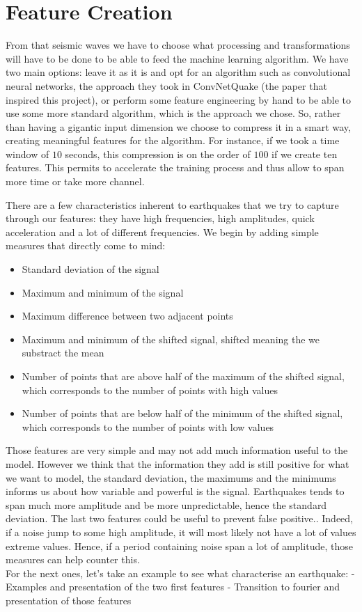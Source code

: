 \documentclass[10pt,conference,compsocconf]{IEEEtran}
\begin{document}
\section{Feature Creation}
From that seismic waves we have to choose what processing and transformations will have to be done to be able to feed the machine learning algorithm. We have two main options: leave it as it is and opt for an algorithm such as convolutional neural networks, the approach they took in ConvNetQuake (the paper \cite{ConvNetPaper} that inspired this project), or perform some feature engineering by hand to be able to use some more standard algorithm, which is the approach we chose. So, rather than having a gigantic input dimension we choose to compress it in a smart way, creating meaningful features for the algorithm. For instance, if we took a time window of $10$ seconds, this compression is on the order of $100$ if we create ten features. This permits to accelerate the training process and thus allow to span more time or take more channel.\newline

There are a few characteristics inherent to earthquakes that we try to capture through our features: they have high frequencies, high amplitudes, quick acceleration and a lot of different frequencies. We begin by adding simple measures that directly come to mind:\newline
\begin{itemize}
	\item{Standard deviation of the signal}
	\item{Maximum and minimum of the signal}
	\item{Maximum difference between two adjacent points}
	\item{Maximum and minimum of the shifted signal, shifted meaning the we substract the mean}
	\item{Number of points that are above half of the maximum of the shifted signal, which corresponds to the number of points with high values}
	\item{Number of points that are below half of the minimum of the shifted signal, which corresponds to the number of points with low values}
\end{itemize}

Those features are very simple and may not add much information useful to the model. However we think that the information they add is still positive for what we want to model, the standard deviation, the maximums and the minimums informs us about how variable and powerful is the signal. Earthquakes tends to span much more amplitude and be more unpredictable, hence the standard deviation. The last two features could be useful to prevent false positive.. Indeed, if a noise jump to some high amplitude, it will most likely not have a lot of values extreme values. Hence, if a period containing noise span a lot of amplitude, those measures can help counter this.\\
For the next ones, let's take an example to see what characterise an earthquake:\newline
- Examples and presentation of the two first features
- Transition to fourier and presentation of those features
\end{document}
